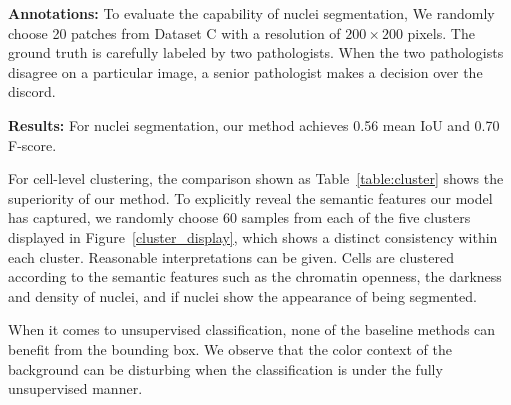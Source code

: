 \documentclass[journal]{IEEEtran}
\begin{document}
\textbf{Annotations:} To evaluate the capability of nuclei segmentation, We randomly choose 20 patches from Dataset C with a resolution of $200 \times 200$ pixels. The ground truth is carefully labeled by two pathologists. When the two pathologists disagree on a particular image, a senior pathologist makes a decision over the discord.

\textbf{Results:} For nuclei segmentation, our method achieves 0.56 mean IoU and 0.70 F-score.

For cell-level clustering, the comparison shown as Table~\ref{table:cluster} shows the superiority of our method. To explicitly reveal the semantic features our model has captured, we randomly choose 60 samples from each of the five clusters displayed in Figure~\ref{cluster_display}, which shows a distinct consistency within each cluster. Reasonable interpretations can be given. Cells are clustered according to the semantic features such as the chromatin openness, the darkness and density of nuclei, and if nuclei show the appearance of being segmented.

{When it comes to unsupervised classification, none of the baseline methods can benefit from the bounding box. We observe that the color context of the background can be disturbing when the classification is under the fully unsupervised manner.}
\end{document}
